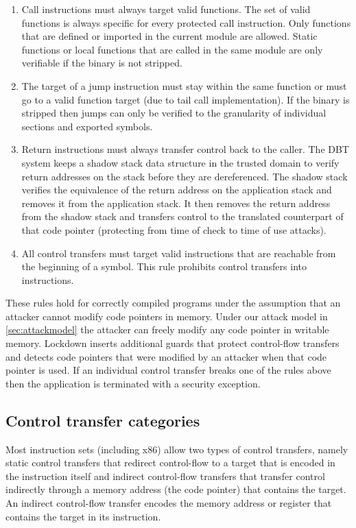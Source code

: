 \documentclass{acm_proc_article-sp}
\begin{document}
\begin{enumerate}
  \item Call instructions must always target valid functions. The set of valid
    functions is always specific for every protected call instruction. Only
    functions that are defined or imported in the current module are allowed.
    Static functions or local functions that are called in the same module are
    only verifiable if the binary is not stripped.
  \item \label{jmprule} The target of a jump instruction must stay within the same
    function or must go to a valid function target (due to tail call
		implementation). If the binary is stripped then jumps can only be verified to the granularity
    of individual sections and exported symbols.
\item Return instructions must always transfer control back to the caller. The
		DBT system keeps a shadow stack data structure in the trusted domain to
    verify return addresses on the stack before they are dereferenced. The
    shadow stack verifies the equivalence of the return address on the
    application stack and removes it from the application stack. It then removes
    the return address from the shadow stack and transfers control to the
    translated counterpart of that code pointer (protecting from time of check
		to time of use attacks).\item All control transfers must target valid instructions that are
    reachable from the beginning of a symbol. This rule prohibits control
    transfers into instructions.\end{enumerate}

These rules hold for correctly compiled programs under the assumption that an
attacker cannot modify code pointers in memory. Under our attack model in
\autoref{sec:attackmodel} the attacker can freely modify any code pointer in
writable memory. Lockdown inserts additional guards that protect control-flow
transfers and detects code pointers that were modified by an attacker when that
code pointer is used. If an individual control transfer breaks one of the rules
above then the application is terminated with a security exception.


\subsection{Control transfer categories}


Most instruction sets (including x86) allow two types of control transfers,
namely static control transfers that redirect control-flow to a target that is
encoded in the instruction itself and indirect control-flow transfers that
transfer control indirectly through a memory address (the code pointer) that
contains the target. An indirect control-flow transfer encodes the memory
address or register that contains the target in its instruction.
\end{document}
